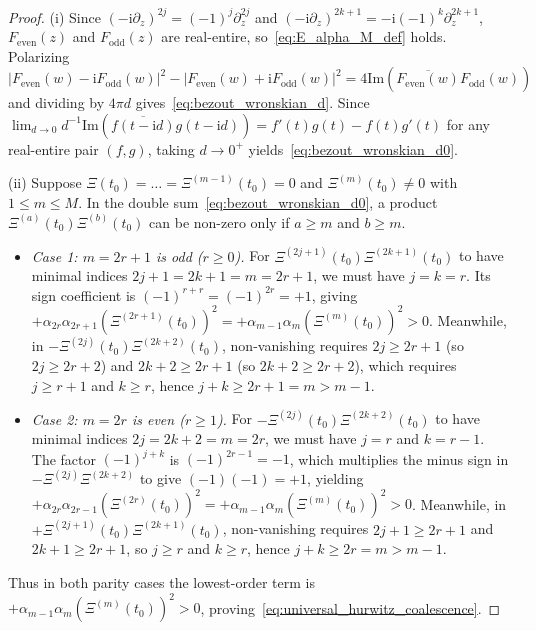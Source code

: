 \documentclass[11pt,reqno]{amsart}
\theoremstyle{definition}
\theoremstyle{remark}
\numberwithin{equation}{section}
\newcommand{\ii}{\mathrm{i}}
\newcommand{\Ima}{\mathrm{Im}}
\begin{document}
\begin{proof}
(i) Since $(-\ii\partial_z)^{2j} = (-1)^j\partial_z^{2j}$ and $(-\ii\partial_z)^{2k+1} = -\ii(-1)^k\partial_z^{2k+1}$, $F_{\mathrm{even}}(z)$ and $F_{\mathrm{odd}}(z)$ are real-entire, so~\eqref{eq:E_alpha_M_def} holds. Polarizing $|F_{\mathrm{even}}(w) - \ii F_{\mathrm{odd}}(w)|^2 - |F_{\mathrm{even}}(w) + \ii F_{\mathrm{odd}}(w)|^2 = 4\Ima(\overline{F_{\mathrm{even}}(w)}F_{\mathrm{odd}}(w))$ and dividing by $4\pi d$ gives~\eqref{eq:bezout_wronskian_d}. Since $\lim_{d \to 0} d^{-1}\Ima(\overline{f(t-\ii d)}g(t-\ii d)) = f'(t)g(t) - f(t)g'(t)$ for any real-entire pair $(f,g)$, taking $d \to 0^+$ yields~\eqref{eq:bezout_wronskian_d0}.

(ii) Suppose $\Xi(t_0) = \dots = \Xi^{(m-1)}(t_0) = 0$ and $\Xi^{(m)}(t_0) \neq 0$ with $1 \le m \le M$. In the double sum~\eqref{eq:bezout_wronskian_d0}, a product $\Xi^{(a)}(t_0)\Xi^{(b)}(t_0)$ can be non-zero only if $a \ge m$ and $b \ge m$.
\begin{itemize}[leftmargin=1.8em]
\item \textit{Case 1: $m = 2r + 1$ is odd ($r \ge 0$).} For $\Xi^{(2j+1)}(t_0)\Xi^{(2k+1)}(t_0)$ to have minimal indices $2j+1 = 2k+1 = m = 2r+1$, we must have $j = k = r$. Its sign coefficient is $(-1)^{r+r} = (-1)^{2r} = +1$, giving $+\alpha_{2r}\alpha_{2r+1}(\Xi^{(2r+1)}(t_0))^2 = +\alpha_{m-1}\alpha_m(\Xi^{(m)}(t_0))^2 > 0$. Meanwhile, in $-\Xi^{(2j)}(t_0)\Xi^{(2k+2)}(t_0)$, non-vanishing requires $2j \ge 2r+1$ (so $2j \ge 2r+2$) and $2k+2 \ge 2r+1$ (so $2k+2 \ge 2r+2$), which requires $j \ge r+1$ and $k \ge r$, hence $j+k \ge 2r+1 = m > m-1$.
\item \textit{Case 2: $m = 2r$ is even ($r \ge 1$).} For $-\Xi^{(2j)}(t_0)\Xi^{(2k+2)}(t_0)$ to have minimal indices $2j = 2k+2 = m = 2r$, we must have $j = r$ and $k = r - 1$. The factor $(-1)^{j+k}$ is $(-1)^{2r-1} = -1$, which multiplies the minus sign in $-\Xi^{(2j)}\Xi^{(2k+2)}$ to give $(-1)(-1) = +1$, yielding $+\alpha_{2r}\alpha_{2r-1}(\Xi^{(2r)}(t_0))^2 = +\alpha_{m-1}\alpha_m(\Xi^{(m)}(t_0))^2 > 0$. Meanwhile, in $+\Xi^{(2j+1)}(t_0)\Xi^{(2k+1)}(t_0)$, non-vanishing requires $2j+1 \ge 2r+1$ and $2k+1 \ge 2r+1$, so $j \ge r$ and $k \ge r$, hence $j+k \ge 2r = m > m-1$.
\end{itemize}
Thus in both parity cases the lowest-order term is $+\alpha_{m-1}\alpha_m(\Xi^{(m)}(t_0))^2 > 0$, proving~\eqref{eq:universal_hurwitz_coalescence}.
\end{proof}
\end{document}
